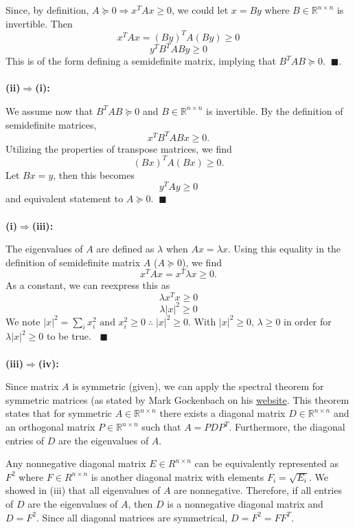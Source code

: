 \documentclass{report}
\begin{document}
Since, by definition, $A \succeq 0 \Rightarrow x^TAx \geq 0$, we could let $x = By$ where $B \in \mathbb{R}^{n \times n}$ is invertible. Then 
$$ x^TAx = (By)^TA(By) \geq 0 $$
$$ y^TB^TABy \geq 0 $$
This is of the form defining a semidefinite matrix, implying that $B^TAB \succeq 0. \;\; \blacksquare$.
\-\\
\-\\
\textbf{(ii)}$\bm{\Rightarrow}$\textbf{(i):}

We assume now that $B^TAB \succeq 0$ and $B \in \mathbb{R}^{n \times n}$ is invertible. By the definition of semidefinite matrices,
$$ x^TB^TABx \geq 0. $$
Utilizing the properties of transpose matrices, we find
$$ (Bx)^TA(Bx) \geq 0. $$
Let $Bx = y$, then this becomes
$$ y^TAy \geq 0 $$
and equivalent statement to $A \succeq 0. \;\; \blacksquare$
\-\\
\-\\
\textbf{(i)}$\bm{\Rightarrow}$\textbf{(iii):}

The eigenvalues of $A$ are defined as $\lambda$ when $Ax = \lambda x$. Using this equality in the definition of semidefinite matrix $A$ ($A \succeq 0$), we find
$$ x^TAx = x^T\lambda x \geq 0. $$
As a constant, we can reexpress this as
$$ \lambda x^Tx \geq 0 $$
$$ \lambda |x|^2 \geq 0 $$
We note $|x|^2 = \sum_{i}{x_i^2} \text{ and } x_i^2 \geq 0 \;\therefore\; |x|^2 \geq 0.$ With $|x|^2 \geq 0$, $\lambda \geq 0$ in order for $\lambda |x|^2 \geq 0$ to be true. $\;\; \blacksquare$
\-\\
\-\\
\textbf{(iii)}$\bm{\Rightarrow}$\textbf{(iv):}

Since matrix $A$ is symmetric (given), we can apply the spectral theorem for symmetric matrices (as stated by Mark Gockenbach on his \href{http://www.math.mtu.edu/~msgocken/ma5630sppering2003/lectures/spectral/sctral/node2.html)}{website}. This theorem states that for symmetric $A \in \mathbb{R}^{n \times n}$ there exists a diagonal matrix $D \in \mathbb{R}^{n \times n}$ and an orthogonal matrix $P \in \mathbb{R}^{n \times n}$ such that $A = PDP^T$. Furthermore, the diagonal entries of $D$ are the eigenvalues of $A$. 

Any nonnegative diagonal matrix $E \in R^{n \times n}$ can be equivalently represented as $F^2$ where $F \in R^{n \times n}$ is another diagonal matrix with elements $F_i = \sqrt{E_i}$. We showed in (iii) that all eigenvalues of $A$ are nonnegative. Therefore, if all entries of $D$ are the eigenvalues of $A$, then $D$ is a nonnegative diagonal matrix and $D = F^2$. Since all diagonal matrices are symmetrical, $D = F^2 = FF^T$. 
\end{document}
